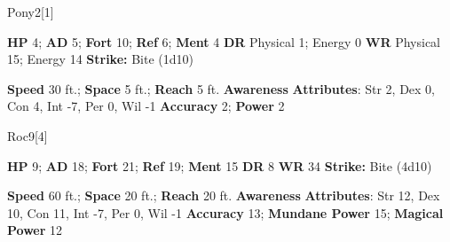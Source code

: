   
  \begin{monsection}{Pony}{2}[1]
    \vspace{-1em}\vspace{-1em}
    \begin{spellcontent}
      \begin{spelltargetinginfo}
        \pari \textbf{HP} 4;
          \textbf{AD} 5;
          \textbf{Fort} 10;
          \textbf{Ref} 6;
          \textbf{Ment} 4
        \pari \textbf{DR} Physical 1; Energy 0
        \pari \textbf{WR} Physical 15; Energy 14
        \pari \textbf{Strike:}
            Bite  (1d10)
      \end{spelltargetinginfo}
    \end{spellcontent}
    \begin{monsterfooter}
      \pari \textbf{Speed} 30 ft.;
        \textbf{Space} 5 ft.;
        \textbf{Reach} 5 ft.
      \pari \textbf{Awareness} 
      \pari \textbf{Attributes}:
        Str 2, Dex 0, Con 4,
        Int -7, Per 0, Wil -1
      \pari \textbf{Accuracy} 2;
        \textbf{Power} 2
    \end{monsterfooter}
  \end{monsection}
  
  
  \begin{monsection}{Roc}{9}[4]
    \vspace{-1em}\vspace{-1em}
    \begin{spellcontent}
      \begin{spelltargetinginfo}
        \pari \textbf{HP} 9;
          \textbf{AD} 18;
          \textbf{Fort} 21;
          \textbf{Ref} 19;
          \textbf{Ment} 15
        \pari \textbf{DR} 8
        \pari \textbf{WR} 34
        \pari \textbf{Strike:}
            Bite  (4d10)
      \end{spelltargetinginfo}
    \end{spellcontent}
    \begin{monsterfooter}
      \pari \textbf{Speed} 60 ft.;
        \textbf{Space} 20 ft.;
        \textbf{Reach} 20 ft.
      \pari \textbf{Awareness} 
      \pari \textbf{Attributes}:
        Str 12, Dex 10, Con 11,
        Int -7, Per 0, Wil -1
      \pari \textbf{Accuracy} 13;
        \textbf{Mundane Power} 15;
      \textbf{Magical Power} 12
    \end{monsterfooter}
  \end{monsection}
  
